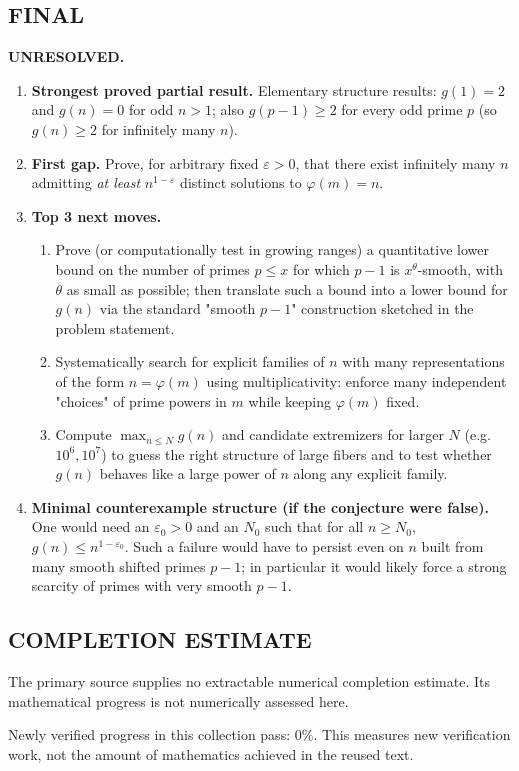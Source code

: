 \subsection*{FINAL}
\textbf{UNRESOLVED.}
\begin{enumerate}
\item[(i)] \textbf{Strongest proved partial result.} Elementary structure results: $g(1)=2$ and $g(n)=0$ for odd $n>1$; also $g(p-1)\ge 2$ for every odd prime $p$ (so $g(n)\ge 2$ for infinitely many $n$).
\item[(ii)] \textbf{First gap.} Prove, for arbitrary fixed $\varepsilon>0$, that there exist infinitely many $n$ admitting \emph{at least} $n^{1-\varepsilon}$ distinct solutions to $\varphi(m)=n$.
\item[(iii)] \textbf{Top 3 next moves.}
  \begin{enumerate}
  \item Prove (or computationally test in growing ranges) a quantitative lower bound on the number of primes $p\le x$ for which $p-1$ is $x^{\theta}$-smooth, with $\theta$ as small as possible; then translate such a bound into a lower bound for $g(n)$ via the standard "smooth $p-1$" construction sketched in the problem statement.
  \item Systematically search for explicit families of $n$ with many representations of the form $n=\varphi(m)$ using multiplicativity: enforce many independent "choices" of prime powers in $m$ while keeping $\varphi(m)$ fixed.
  \item Compute $\max_{n\le N} g(n)$ and candidate extremizers for larger $N$ (e.g. $10^6,10^7$) to guess the right structure of large fibers and to test whether $g(n)$ behaves like a large power of $n$ along any explicit family.
  \end{enumerate}
\item[(iv)] \textbf{Minimal counterexample structure (if the conjecture were false).} One would need an $\varepsilon_0>0$ and an $N_0$ such that for all $n\ge N_0$, $g(n)\le n^{1-\varepsilon_0}$. Such a failure would have to persist even on $n$ built from many smooth shifted primes $p-1$; in particular it would likely force a strong scarcity of primes with very smooth $p-1$.
\end{enumerate}




\subsection*{COMPLETION ESTIMATE}
The primary source supplies no extractable numerical completion estimate. Its mathematical progress is not numerically assessed here.

Newly verified progress in this collection pass: $0\%$. This measures new verification work, not the amount of mathematics achieved in the reused text.
